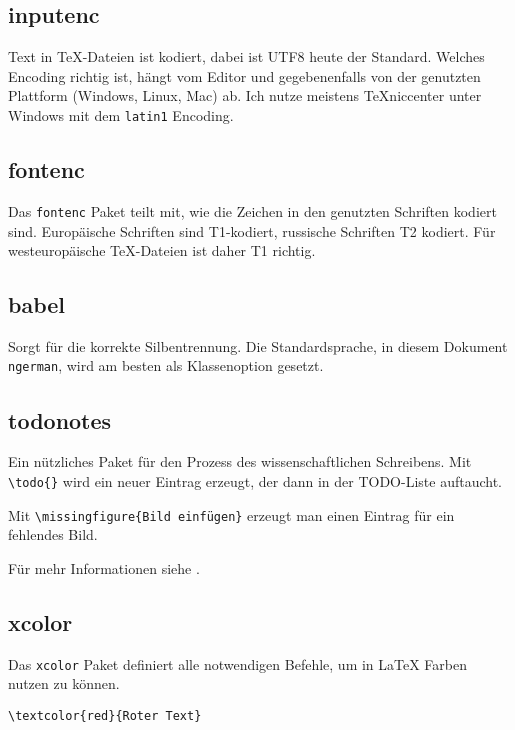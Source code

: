 

\subsection{inputenc}

Text in \TeX-Dateien ist kodiert, dabei ist UTF8 heute der Standard. Welches Encoding richtig ist, hängt vom Editor und gegebenenfalls von der genutzten Plattform (Windows, Linux, Mac) ab. Ich nutze meistens TeXniccenter unter Windows mit dem \texttt{latin1} Encoding.

\subsection{fontenc}

Das \texttt{fontenc} Paket teilt mit, wie die Zeichen in den genutzten Schriften kodiert sind. Europäische Schriften sind T1-kodiert, russische Schriften T2 kodiert. Für westeuropäische \TeX-Dateien ist daher T1 richtig.

\subsection{babel}

Sorgt für die korrekte Silbentrennung. Die Standardsprache, in diesem Dokument \texttt{ngerman}, wird am besten als Klassenoption gesetzt.

\subsection{todonotes}

Ein nützliches Paket für den Prozess des wissenschaftlichen Schreibens. Mit \verb|\todo{}| wird ein neuer Eintrag erzeugt, der dann in der TODO-Liste auftaucht. 

Mit \verb|\missingfigure{Bild einfügen}| erzeugt man einen Eintrag für ein fehlendes Bild.

Für mehr Informationen siehe \cite{todonotes}.

\subsection{xcolor}

Das \texttt{xcolor} Paket definiert alle notwendigen Befehle, um in \LaTeX{} Farben nutzen zu können.

\begin{lstlisting}
\textcolor{red}{Roter Text}
\end{lstlisting}

